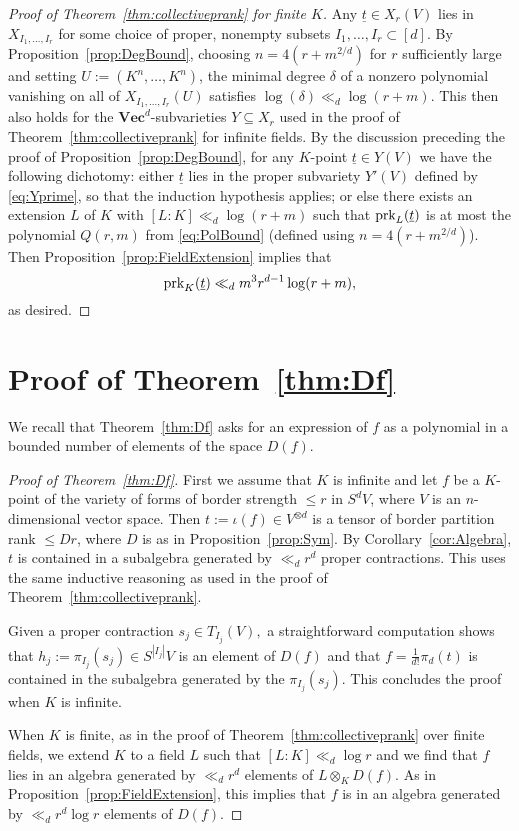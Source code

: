 \documentclass{amsart}
\renewcommand{\Vec}{\mathbf{Vec}}
\newcommand{\prk}{\textnormal{prk}}
\newcommand{\ul}[1]{\underline{#1}}
\begin{document}
\begin{proof}[Proof of Theorem~\ref{thm:collectiveprank} for finite
$K$]
Any $\ul{t}\in X_r(V)$ lies in $X_{I_1,\ldots,I_r}$ for some choice of proper, nonempty subsets $I_1,\ldots,I_r \subset [d].$  By Proposition~\ref{prop:DegBound}, choosing $n=4(r+m^{2/d})$ for $r$
sufficiently large and setting $U:=(K^n,\ldots,K^n)$, the minimal
degree $\delta $ of a nonzero polynomial vanishing on all of
$X_{I_1,\ldots,I_r}(U)$ satisfies $\log(\delta) \ll_d \log(r+m)$. This then also holds for the
$\Vec^d$-subvarieties $Y \subseteq X_r$ used in the proof
of Theorem~\ref{thm:collectiveprank} for infinite fields. By the
discussion preceding the proof of Proposition~\ref{prop:DegBound},
for any $K$-point $\ul{t} \in Y(V)$ we have the following dichotomy:
either $\ul{t}$ lies in the
proper subvariety $Y'(V)$ defined by \eqref{eq:Yprime}, so that the
induction hypothesis applies; or else there exists an extension $L$
of $K$ with $[L:K] \ll_d \log(r+m)$ such that $\prk_L(\ul{t})$ is at
most the polynomial $Q(r,m)$ from \eqref{eq:PolBound} (defined using $n=4(r+m^{2/d})$).
Then Proposition~\ref{prop:FieldExtension} implies that
\[ \prk_K(\ul{t}) \ll_d m^3r^{d-1}\log(r+m), \]
as desired. 
\end{proof}

\section{Proof of Theorem~\ref{thm:Df}}

We recall that Theorem~\ref{thm:Df} asks for an expression of $f$ as a polynomial in a bounded number of elements of the
space $D(f).$ 

\begin{proof}[Proof of Theorem~\ref{thm:Df}]
First we assume that $K$ is infinite and let $f$ be a $K$-point of the
variety of forms of border strength $\leq r$ in $S^d V$, where $V$ is an $n$-dimensional
vector space. Then $t:=\iota(f) \in V^{\otimes d}$ is a tensor of border partition
rank $\leq Dr$, where $D$ is as in Proposition~\ref{prop:Sym}. By Corollary~\ref{cor:Algebra}, $t$ is contained in a subalgebra generated by $\ll_d r^d$ proper contractions. This
uses the same inductive reasoning as used in the proof of Theorem~\ref{thm:collectiveprank}.

Given a proper contraction $s_j \in T_{I_j}(V),$ a
straightforward computation shows that $h_j:=\pi_{I_j}(s_j) \in S^{|I_j|}
V$ is an element of $D(f)$ and that $f = \frac{1}{d!}\pi_d(t)$ is contained in the subalgebra generated by the $\pi_{I_j}(s_j).$ This concludes
the proof when $K$ is infinite.

When $K$ is finite, as in the proof of Theorem~\ref{thm:collectiveprank}
over finite fields, we extend $K$ to a field $L$ such that $[L:K] \ll_d \log r$ and we find that $f$ lies in an algebra
generated by $\ll_d r^d$ elements of $L \otimes_K D(f). $ As in Proposition~\ref{prop:FieldExtension}, this implies that $f$ is in an algebra generated by $\ll_d r^d\log r$ elements of $D(f).$ 
\end{proof}



\end{document}
